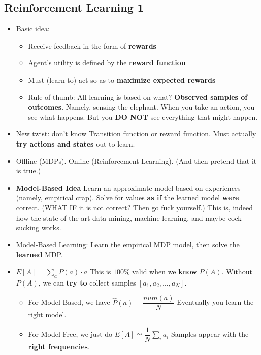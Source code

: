 \documentclass[twocolumn]{article}
\begin{document}
\subsection{Reinforcement Learning 1}
\label{sec:reinf-learn-1}

\begin{itemize}
\item Basic idea:
  \begin{itemize}
  \item Receive feedback in the form of \textbf{rewards}
  \item Agent's utility is defined by the \textbf{reward function}
  \item Must (learn to) act so as to \textbf{maximize expected
      rewards}
  \item Rule of thumb: All learning is based on what? \textbf{Observed
    samples of outcomes}. Namely, sensing the elephant. When you take
  an action, you see what happens. But you \textbf{DO NOT} see
  everything that might happen.
  \end{itemize}
\item New twist: don't know Transition function or reward
  function. Must actually \textbf{try actions and states} out to
  learn. 
\item Offline (MDPs). Online (Reinforcement Learning). (And then
  pretend that it is true.)
\item \textbf{Model-Based Idea} Learn an approximate model based on
  experiences (namely, empirical crap). Solve for values \textbf{as
    if} the learned model \textbf{were} correct. (WHAT IF it is not
  correct? Then go fuck yourself.) This is, indeed how the
  state-of-the-art data mining, machine learning, and maybe cock
  sucking works.
\item Model-Based Learning: Learn the empirical MDP model, then solve
  the \textbf{learned} MDP.
\item $E[A]=\sum_{a}P(a)\cdot a$ This is $100\%$ valid when we
  \textbf{know} $P(A)$. Without $P(A)$, we can \textbf{try to} collect
  samples $[a_{1},a_{2},\ldots,a_{N}]$.
  \begin{itemize}
  \item For Model Based, we have $\hat{P}(a)=\dfrac{num(a)}{N}$
    Eventually you learn the right model.\\[1pt]
  \item For Model Free, we just do $E[A]\simeq \dfrac{1}{N}\sum_{i}
    a_{i}$ Samples appear with the \textbf{right frequencies}.
  \end{itemize}

\end{itemize}
\end{document}
